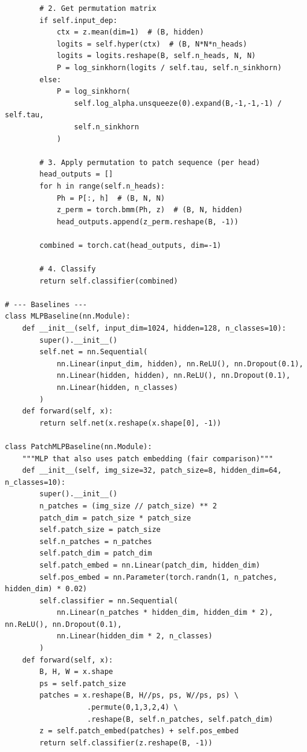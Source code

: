 \documentclass[11pt,a4paper]{report}
\begin{document}
\begin{small}
\begin{verbatim}
        # 2. Get permutation matrix
        if self.input_dep:
            ctx = z.mean(dim=1)  # (B, hidden)
            logits = self.hyper(ctx)  # (B, N*N*n_heads)
            logits = logits.reshape(B, self.n_heads, N, N)
            P = log_sinkhorn(logits / self.tau, self.n_sinkhorn)
        else:
            P = log_sinkhorn(
                self.log_alpha.unsqueeze(0).expand(B,-1,-1,-1) / self.tau, 
                self.n_sinkhorn
            )
        
        # 3. Apply permutation to patch sequence (per head)
        head_outputs = []
        for h in range(self.n_heads):
            Ph = P[:, h]  # (B, N, N)
            z_perm = torch.bmm(Ph, z)  # (B, N, hidden)
            head_outputs.append(z_perm.reshape(B, -1))
        
        combined = torch.cat(head_outputs, dim=-1)
        
        # 4. Classify
        return self.classifier(combined)

# --- Baselines ---
class MLPBaseline(nn.Module):
    def __init__(self, input_dim=1024, hidden=128, n_classes=10):
        super().__init__()
        self.net = nn.Sequential(
            nn.Linear(input_dim, hidden), nn.ReLU(), nn.Dropout(0.1),
            nn.Linear(hidden, hidden), nn.ReLU(), nn.Dropout(0.1),
            nn.Linear(hidden, n_classes)
        )
    def forward(self, x):
        return self.net(x.reshape(x.shape[0], -1))

class PatchMLPBaseline(nn.Module):
    """MLP that also uses patch embedding (fair comparison)"""
    def __init__(self, img_size=32, patch_size=8, hidden_dim=64, n_classes=10):
        super().__init__()
        n_patches = (img_size // patch_size) ** 2
        patch_dim = patch_size * patch_size
        self.patch_size = patch_size
        self.n_patches = n_patches
        self.patch_dim = patch_dim
        self.patch_embed = nn.Linear(patch_dim, hidden_dim)
        self.pos_embed = nn.Parameter(torch.randn(1, n_patches, hidden_dim) * 0.02)
        self.classifier = nn.Sequential(
            nn.Linear(n_patches * hidden_dim, hidden_dim * 2), nn.ReLU(), nn.Dropout(0.1),
            nn.Linear(hidden_dim * 2, n_classes)
        )
    def forward(self, x):
        B, H, W = x.shape
        ps = self.patch_size
        patches = x.reshape(B, H//ps, ps, W//ps, ps) \
                   .permute(0,1,3,2,4) \
                   .reshape(B, self.n_patches, self.patch_dim)
        z = self.patch_embed(patches) + self.pos_embed
        return self.classifier(z.reshape(B, -1))


\end{verbatim}
\end{small}
\end{document}
